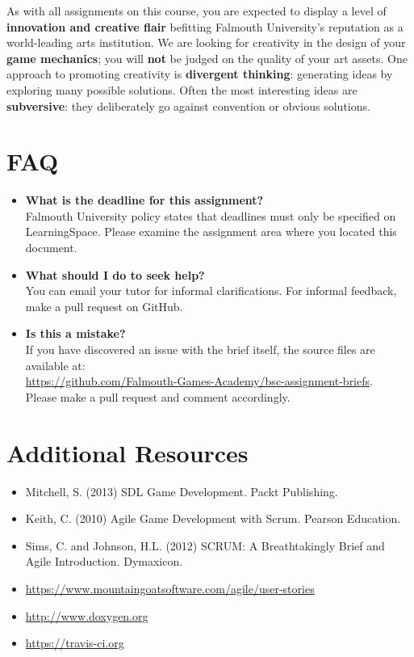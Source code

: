 \documentclass{../fal_assignment}
\begin{document}
As with all assignments on this course, you are expected to display a level of
\textbf{innovation and creative flair} befitting Falmouth University's reputation as a world-leading
arts institution.
We are looking for creativity in the design of your \textbf{game mechanics};
you will \textbf{not} be judged on the quality of your art assets.
One approach to promoting creativity is
\textbf{divergent thinking}: generating ideas by exploring many possible solutions.
Often the most interesting ideas are \textbf{subversive}: they deliberately go against
convention or obvious solutions.

\section*{FAQ}

\begin{itemize}
	\item 	\textbf{What is the deadline for this assignment?} \\ 
    		Falmouth University policy states that deadlines must only be specified on LearningSpace. Please examine the assignment area where you located this document.
    		
	\item 	\textbf{What should I do to seek help?} \\ 
    		You can email your tutor for informal clarifications. For informal feedback, make a pull request on GitHub. 
    		
    	\item 	\textbf{Is this a mistake?} \\ 	
    		If you have discovered an issue with the brief itself, the source files are available at: \\
    		\url{https://github.com/Falmouth-Games-Academy/bsc-assignment-briefs}.\\
    		 Please make a pull request and comment accordingly.
\end{itemize}

\section*{Additional Resources}

\begin{itemize}
    \item Mitchell, S. (2013) SDL Game Development. Packt Publishing.
    \item Keith, C. (2010) Agile Game Development with Scrum. Pearson Education.
    \item Sims, C. and Johnson, H.L. (2012) SCRUM: A Breathtakingly Brief and Agile Introduction. Dymaxicon.
    \item \url{https://www.mountaingoatsoftware.com/agile/user-stories}
    \item \url{http://www.doxygen.org}
    \item \url{https://travis-ci.org}
\end{itemize}
\end{document}
